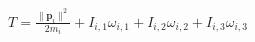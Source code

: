 \documentclass[preview]{standalone}
\begin{document}
\begin{align*}
T = \frac{\|\mathbf p_i\|^2}{2m_i} + I_{i,1}\omega_{i,1} + I_{i,2}\omega_{i,2} + I_{i,3}\omega_{i,3}
\end{align*}
\end{document}
